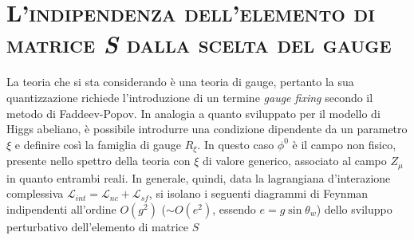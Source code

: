 \documentclass[11pt]{article}
\begin{document}
    \section{\centering\textsc{L'indipendenza dell'elemento di matrice \textit{S} dalla scelta del gauge} } %
    La teoria che si sta considerando è una teoria di gauge, pertanto la sua quantizzazione richiede l'introduzione di un termine \textit{gauge fixing} secondo il metodo di Faddeev-Popov. In analogia a quanto sviluppato per il modello di Higgs abeliano,
    è possibile introdurre una condizione dipendente da un parametro $\xi$ e definire così la famiglia di gauge $R_\xi$. In questo caso $\phi^0$ è il campo non fisico, presente nello spettro della teoria con $\xi$ di valore generico, associato al campo $Z_\mu$ in quanto entrambi reali.
    In generale, quindi, data la lagrangiana d'interazione complessiva $\mathcal{L}_{int}=\mathcal{L}_{nc}+\mathcal{L}_{sf}$, si isolano i seguenti diagrammi di Feynman indipendenti all'ordine $O(g^2)$ ($\sim O(e^2)$, essendo $e=g\sin\theta_w$) dello sviluppo perturbativo
    dell'elemento di matrice $S$
\end{document}
